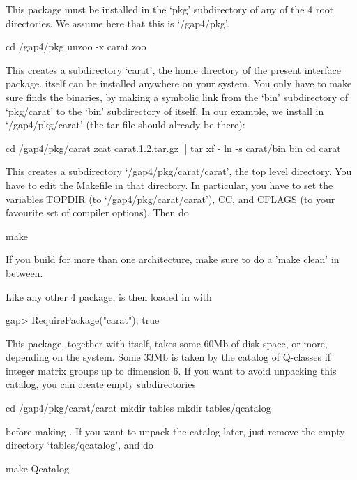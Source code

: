 
This package must be installed in the `pkg' subdirectory of any of
the {\GAP} 4 root directories. We assume here that this is `/gap4/pkg'.

\begintt
cd /gap4/pkg
unzoo -x carat.zoo
\endtt

This creates a subdirectory `carat', the home directory of the present
interface package. {\CARAT} itself can be installed anywhere on your 
system. You only have to make sure {\GAP} finds the {\CARAT} binaries, 
by making a symbolic link from the `bin' subdirectory of `pkg/carat' to 
the `bin' subdirectory of {\CARAT} itself. In our example, we install 
{\CARAT} in `/gap4/pkg/carat' (the {\CARAT} tar file should already be 
there):

\begintt
cd /gap4/pkg/carat
zcat carat.1.2.tar.gz || tar xf -
ln -s carat/bin bin
cd carat
\endtt

This creates a subdirectory `/gap4/pkg/carat/carat', the {\CARAT} top level
directory. You have to edit the Makefile in that directory. In particular,
you have to set the variables TOPDIR (to `/gap4/pkg/carat/carat'), CC, and
CFLAGS (to your favourite set of compiler options). Then do 

\begintt
make
\endtt

If you build for more than one architecture, make sure to do a 
'make clean' in between.

Like any other {\GAP} 4 package, {\CARAT} is then loaded in {\GAP} with

\beginexample
gap> RequirePackage("carat");
true
\endexample

This package, together with {\CARAT} itself, takes some 60Mb of disk space,
or more, depending on the system. Some 33Mb is taken by the catalog
of Q-classes if integer matrix groups up to dimension 6. If you want
to avoid unpacking this catalog, you can create empty subdirectories

\begintt
cd /gap4/pkg/carat/carat
mkdir tables
mkdir tables/qcatalog
\endtt

before making {\CARAT}. If you want to unpack the catalog later, just
remove the empty directory `tables/qcatalog', and do

\begintt
make Qcatalog
\endtt


